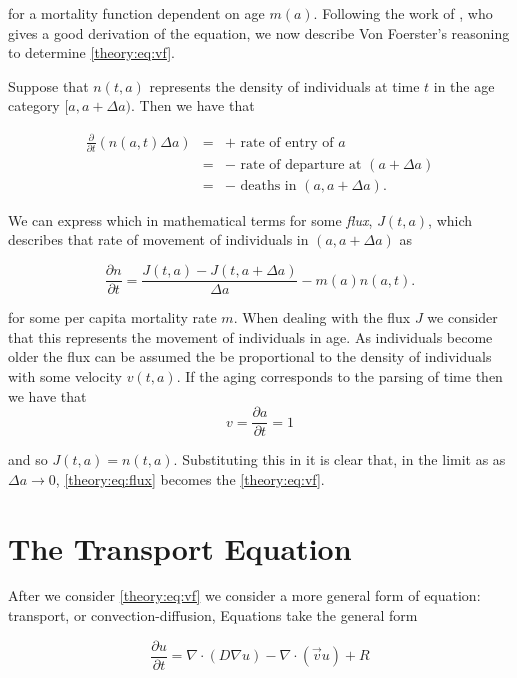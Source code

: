 \documentclass[../main.tex]{subfiles}
\begin{document}
  for a mortality function dependent on age $m(a)$. Following the work of \cite{trucco1965}, who gives a good derivation of the equation, we now describe Von Foerster's reasoning to determine \autoref{theory:eq:vf}.

  Suppose that $n(t, a)$ represents the density of individuals at time $t$ in the age category $[a, a + \Delta a)$. Then we have that

  \begin{eqnarray}
    \frac{\partial}{\partial t} \left( n(a, t) \Delta a \right)
    &=& + \mbox{ rate of entry of } a \nonumber \\
    &=& - \mbox{ rate of departure at } (a + \Delta a) \nonumber \\
    &=& - \mbox{ deaths in } (a, a + \Delta a).
  \end{eqnarray}

  We can express which in mathematical terms for some \emph{flux}, $J(t, a)$, which describes that rate of movement of individuals in $(a, a + \Delta a)$ as

  \begin{equation}\label{theory:eq:flux}
    \frac{\partial n}{\partial t} = \frac{J(t, a) - J(t, a + \Delta a)}{\Delta a} - m(a) n(a, t).
  \end{equation}

  for some per capita mortality rate $m$. When dealing with the flux $J$ we consider that this represents the movement of individuals in age. As individuals become older the flux can be assumed the be proportional to the density of individuals with some velocity $v(t, a)$. If the aging corresponds to the parsing of time then we have that
  $$ v = \frac{\partial a}{\partial t} = 1$$

  and so $J(t, a) = n(t, a)$. Substituting this in it is clear that, in the limit as as $\Delta a \to 0$, \autoref{theory:eq:flux} becomes the \autoref{theory:eq:vf}.

  \section{The Transport Equation}\label{theory:sec:transport}
  After we consider \autoref{theory:eq:vf} we consider a more general form of equation: transport, or convection-diffusion, Equations take the general form

  \begin{equation}\label{theory:eq:transport}
    \frac{\partial u}{\partial t} = \nabla \cdot (D \nabla u) - \nabla \cdot (\vec{v} u) + R
  \end{equation}
\end{document}
